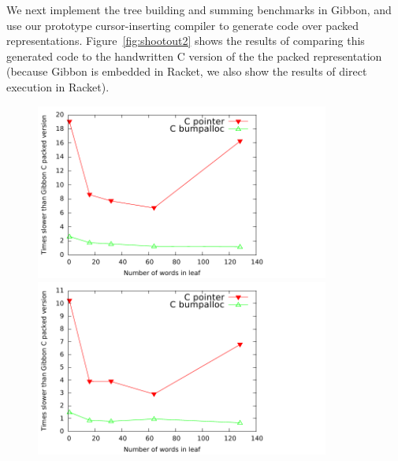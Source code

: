 \documentclass[a4paper,english]{lipics-v2016}
\newcommand{\treelang}{Gibbon\xspace} %
\begin{document}
We next implement the tree building and summing benchmarks in \treelang{}, and
use our prototype cursor-inserting compiler to generate code over packed
representations. Figure~\ref{fig:shootout2} shows the results of comparing this
generated code to the handwritten C version of the the packed representation
(because \treelang{} is embedded in Racket, we also show the results of direct
execution in Racket).
%






\begin{figure}[t]
  \hspace{-4mm}
  \begin{minipage}{1.04\textwidth}
    \begin{minipage}{.49\textwidth}
      \centering
      \includegraphics[width=3.8in]{./figs/slowdown_leaves_build.pdf}
    \end{minipage}
    \begin{minipage}{.49\textwidth}
      \includegraphics[width=3.8in]{./figs/slowdown_leaves_add1.pdf}
    \end{minipage}
  \end{minipage}
  \vspace{-4mm}
  \caption{}
  \label{fig:slowdown}
\end{figure}
\end{document}
